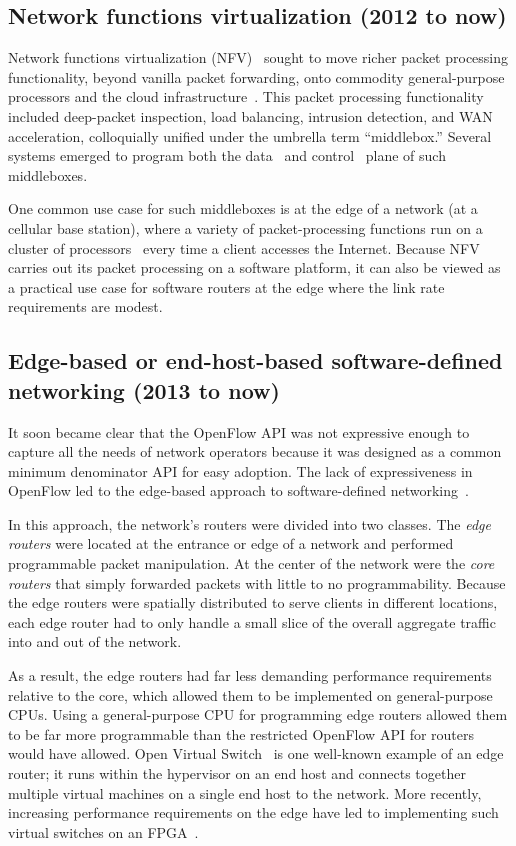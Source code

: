 \subsection{Network functions virtualization (2012 to now)}
Network functions virtualization (NFV)~\cite{nfv_etsi_2012} sought to move
richer packet processing functionality, beyond vanilla packet forwarding, onto
commodity general-purpose processors and the cloud
infrastructure~\cite{aplomb}. This packet processing functionality included
deep-packet inspection, load balancing, intrusion detection, and WAN
acceleration, colloquially unified under the umbrella term ``middlebox.''
Several systems emerged to program both the data~\cite{netbricks} and
control~\cite{opennf} plane of such middleboxes.

One common use case for such middleboxes is at the edge of a network (\eg at a
cellular base station), where a variety of packet-processing functions run on a
cluster of processors~\cite{e2} every time a client accesses the Internet.
Because NFV carries out its packet processing on a software platform, it can
also be viewed as a practical use case for software routers at the edge where
the link rate requirements are modest.

\subsection{Edge-based or end-host-based software-defined networking (2013 to now)}
It soon became clear that the OpenFlow API was not expressive enough to capture
all the needs of network operators because it was designed as a common minimum
denominator API for easy adoption. The lack of expressiveness in OpenFlow led
to the edge-based approach to software-defined networking~\cite{fabric_sdn,
nvp, openvswitch}.

In this approach, the network's routers were divided into two classes. The {\em
edge routers} were located at the entrance or edge of a network and performed
programmable packet manipulation. At the center of the network were the {\em
core routers} that simply forwarded packets with little to no programmability.
Because the edge routers were spatially distributed to serve clients in
different locations, each edge router had to only handle a small slice of the
overall aggregate traffic into and out of the network.

As a result, the edge routers had far less demanding performance requirements
relative to the core, which allowed them to be implemented on general-purpose
CPUs.  Using a general-purpose CPU for programming edge routers allowed them to
be far more programmable than the restricted OpenFlow API for routers would
have allowed. Open Virtual Switch~\cite{openvswitch} is one well-known example
of an edge router; it runs within the hypervisor on an end host and connects
together multiple virtual machines on a single end host to the network.  More
recently, increasing performance requirements on the edge have led to
implementing such virtual switches on an FPGA~\cite{daniel_firestone_nsdi}.

